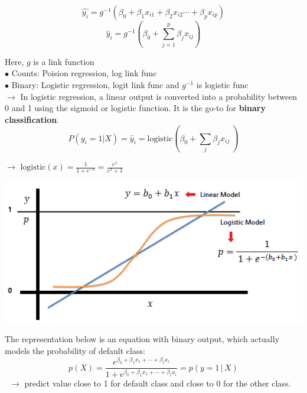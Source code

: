 \documentclass[letterpaper, 10.5pt,landscape]{article}
\begin{document}
\begin{multicols*}{3}
\[\hat{y_{i}} = g^{-1}\left(\beta_{0} + \beta_{1} x_{i1} + \beta_{2} x_{i2} \cdots + \beta_{p} x_{ip} \right) \]
\vspace{-5pt}
\[\boxed{\hat{y}_{i} = g^{-1}\left(\beta_{0} + \sum_{j=1}^{p} \beta_{j} x_{ij}  \right)}\]

Here, $g$ is a link function 
\\

$\bullet$ Counts: Poision regression, log link func \\
$\bullet$ Binary: Logistic regression, logit link  func and $g^{-1}$ is logistic func \\


$\rightarrow$ In logistic regression, a linear output is converted into a probability between 0 and 1 using the sigmoid or logistic function.  It is the go-to for \textbf{binary classification}.
\vspace{-5pt}
\[\boxed{P(y_{i}=1|X) = \hat{y}_{i} = \text{logistic} \left(\beta_{0} + \sum_{j} \beta_{j} x_{ij} \ \right)} \]

$\rightarrow$ \(\boxed{\text{logistic}(x) = \frac{1}{1+e^{-x}} = \frac{e^{x}}{e^{x} +1} }\)

\begin{center}
    \begin{minipage}{\linewidth}
    \includegraphics[width=\textwidth]{figures/logistic_function_regression.PNG}
    \end{minipage}
\end{center}


The representation below is an equation with binary output, which actually models the probability of default class: 
\[\boxed{ p(X) = \frac{e^{\beta_{0} + \beta_{1}x_{1} + \cdots + \beta_{i} x_{i}}}{1 + e^{\beta_{0} + \beta_{1}x_{1} + \cdots + \beta_{i} x_{i}}}  = p(y = 1 \, | \, X)}\] \
$\rightarrow$  predict value close to 1 for default class and close to 0 for the other class. \\


\end{multicols*}
\end{document}
